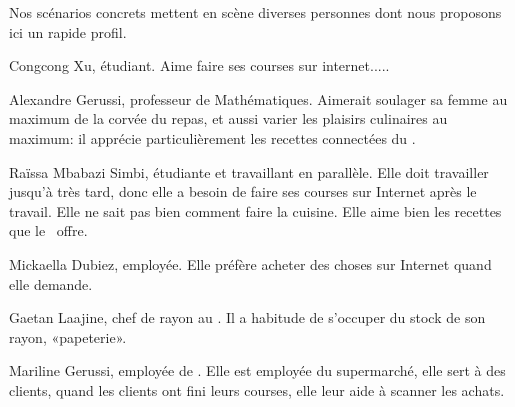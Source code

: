 Nos scénarios concrets mettent en scène diverses personnes dont nous proposons ici un rapide profil.
\blank[big]

Congcong Xu, étudiant.\crlf
Aime faire ses courses sur internet.....
\stopfiguretext

Alexandre Gerussi, professeur de Mathématiques.\crlf
Aimerait soulager sa femme au maximum de la corvée du repas, et aussi varier les plaisirs culinaires au maximum: il apprécie particulièrement les recettes connectées du \fm.
\stopfiguretext

Raïssa Mbabazi Simbi, étudiante et travaillant en parallèle.\crlf
Elle doit travailler jusqu'à très tard, donc elle a besoin de faire ses courses sur Internet après le travail. 
Elle ne sait pas bien comment faire la cuisine.
Elle aime bien les recettes que le \fm\ offre.
\stopfiguretext

Mickaella Dubiez, employée.\crlf
Elle préfère acheter des choses sur Internet quand elle demande.
\stopfiguretext

Gaetan Laajine, chef de rayon au \fm.\crlf
Il a habitude de s'occuper du stock de son rayon, «papeterie».
\stopfiguretext

Mariline Gerussi, employée de \fm.\crlf
Elle est employée du supermarché, elle sert à des clients, quand les clients ont fini leurs courses, elle leur aide à scanner les achats.
\stopfiguretext
